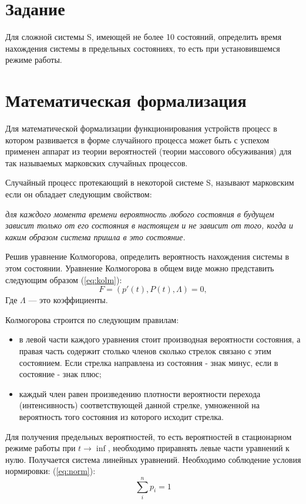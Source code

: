 \chapter{Задание}

Для сложной системы S, имеющей не более 10 состояний, определить время нахождения системы в
 предельных состояниях, то есть при установившемся режиме работы.
\chapter{Математическая формализация}
Для математической формализации функционирования устройств процесс в котором
развивается в форме случайного процесса может быть с успехом применен аппарат
из теории вероятностей (теории массового обсуживания) для так называемых 
марковских случайных процессов.

Случайный процесс протекающий в некоторой системе S, называют марковским если он
 обладает следующим свойством:   

\noindent\textit{для каждого момента времени вероятность любого состояния в будущем зависит 
только от его состояния в настоящем и не зависит от того, когда и каким образом 
система пришла в это состояние.}

Решив уравнение Колмогорова, определить вероятность нахождения системы в
этом состоянии. Уравнение Колмогорова в общем виде можно представить следующим образом (\ref{eq:kolm}):
\begin{equation}\label{eq:kolm}
    F = (p'(t), P(t), \Lambda) = 0,
\end{equation} 
Где $\Lambda$ — это коэффициенты.

 Колмогорова строится по следующим правилам:
\begin{itemize}
    \item в левой части каждого уравнения стоит производная вероятности состояния, а правая часть содержит столько членов сколько стрелок связано с этим состоянием. Если стрелка направлена из
    состояния - знак минус, если в состояние - знак плюс;
    \item каждый член равен произведению плотности вероятности перехода (интенсивность) соответствующей данной стрелке, умноженной на вероятность того состояния из которого исходит стрелка.
\end{itemize}
Для получения предельных вероятностей, то есть вероятностей в стационарном 
режиме работы при $t \rightarrow \inf$, необходимо приравнять левые части 
уравнений к нулю. Получается система линейных уравнений. Необходимо 
соблюдение условия нормировки: (\ref{eq:norm}):
\begin{equation}\label{eq:norm}
    \sum_{i}^{n}p_i = 1
\end{equation}
